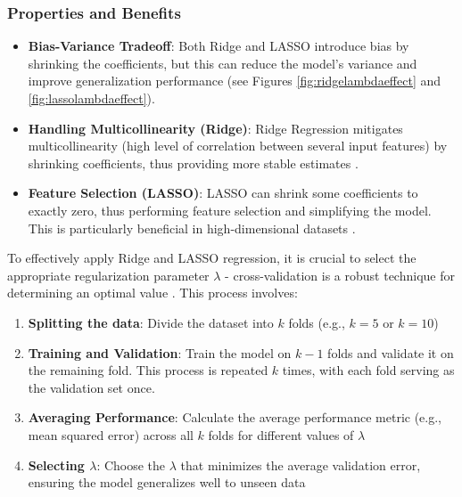 \documentclass[english,11pt,a4paper,titlepage]{article}
\begin{document}
	\subsubsection*{Properties and Benefits}
	\begin{itemize}
		\item \textbf{Bias-Variance Tradeoff}: Both Ridge and LASSO introduce bias by shrinking the coefficients, but this can reduce the model's variance and improve generalization performance \cite{sohilIntroductionStatisticalLearning2022} (see Figures \ref{fig:ridgelambdaeffect} and \ref{fig:lassolambdaeffect}).
		\item \textbf{Handling Multicollinearity (Ridge)}: Ridge Regression mitigates multicollinearity (high level of correlation between several input features) by shrinking coefficients, thus providing more stable estimates \cite{hoerlRidgeRegressionBiased1970,marquardtRidgeRegressionPractice1975}.
		\item \textbf{Feature Selection (LASSO)}: LASSO can shrink some coefficients to exactly zero, thus performing feature selection and simplifying the model. This is particularly beneficial in high-dimensional datasets \cite{tibshiraniRegressionShrinkageSelection1996}.
	\end{itemize}
	
	To effectively apply Ridge and LASSO regression, it is crucial to select the appropriate regularization parameter \( \lambda \) - cross-validation is a robust technique for determining an optimal value \cite{sohilIntroductionStatisticalLearning2022}. This process involves:
	\begin{enumerate}
		\item \textbf{Splitting the data}: Divide the dataset into \( k \) folds (e.g., \( k = 5 \) or \( k = 10 \))
		\item \textbf{Training and Validation}: Train the model on \( k - 1 \) folds and validate it on the remaining fold. This process is repeated \( k \) times, with each fold serving as the validation set once.
		\item \textbf{Averaging Performance}: Calculate the average performance metric (e.g., mean squared error) across all \( k \) folds for different values of \( \lambda \)
		\item \textbf{Selecting \( \lambda \)}: Choose the \( \lambda \) that minimizes the average validation error, ensuring the model generalizes well to unseen data
	\end{enumerate}
	
\end{document}

